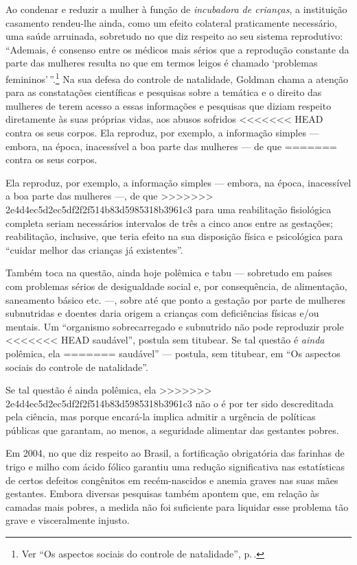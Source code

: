 Ao condenar e reduzir a mulher à função de \textit{incubadora de crianças}, a
instituição casamento rendeu-lhe ainda, como um efeito colateral
praticamente necessário, uma saúde arruinada, sobretudo no que diz
respeito ao seu sistema reprodutivo: ``Ademais, é consenso entre os médicos mais sérios que a reprodução constante da parte das mulheres resulta no que em termos leigos é
chamado `problemas femininos'\,''.\footnote{Ver ``Os aspectos sociais do controle de natalidade'', p.\,\pageref{saude}.} Na
sua defesa do controle de natalidade, Goldman chama a atenção
para as constatações científicas e pesquisas sobre a temática e o
direito das mulheres de terem acesso a essas informações e pesquisas que
diziam respeito diretamente às suas próprias vidas, aos abusos sofridos
<<<<<<< HEAD
contra os seus corpos. Ela reproduz, por exemplo, a informação simples
--- embora, na época, inacessível a boa parte das mulheres --- de que
=======
contra os seus corpos. 

Ela reproduz, por exemplo, a informação simples
--- embora, na época, inacessível a boa parte das mulheres ---, de que
>>>>>>> 2e4d4ec5d2ec5df2f2f514b83d5985318b3961c3
para uma reabilitação fisiológica completa seriam necessários intervalos
de três a cinco anos entre as gestações; reabilitação, inclusive, que
teria efeito na sua disposição física e psicológica para ``cuidar melhor
das crianças já existentes''.

Também toca na questão, ainda hoje polêmica e tabu --- sobretudo em países com problemas sérios de desigualdade
social e, por consequência, de alimentação, saneamento básico etc. ---,
sobre até que ponto a gestação por parte de mulheres subnutridas e
doentes daria origem a crianças com deficiências físicas e/ou mentais.
Um ``organismo sobrecarregado e subnutrido não pode reproduzir prole
<<<<<<< HEAD
saudável'', postula sem titubear. Se tal questão é \emph{ainda} polêmica, ela
=======
saudável'' --- postula, sem titubear, em ``Os aspectos sociais do
controle de natalidade''. 

Se tal questão é ainda polêmica, ela
>>>>>>> 2e4d4ec5d2ec5df2f2f514b83d5985318b3961c3
não o é por ter sido descreditada pela ciência, mas porque encará-la
implica admitir a urgência de políticas públicas que garantam, ao menos,
a seguridade alimentar das gestantes pobres.

Em 2004, no que diz respeito ao
Brasil, a fortificação obrigatória
das farinhas de trigo e milho com ácido fólico garantiu uma redução
significativa nas estatísticas de certos defeitos congênitos em
recém-nascidos e anemia graves nas suas mães gestantes. Embora
diversas pesquisas também apontem que, em relação às camadas
mais pobres, a medida não foi suficiente para liquidar esse problema tão
grave e visceralmente injusto.

